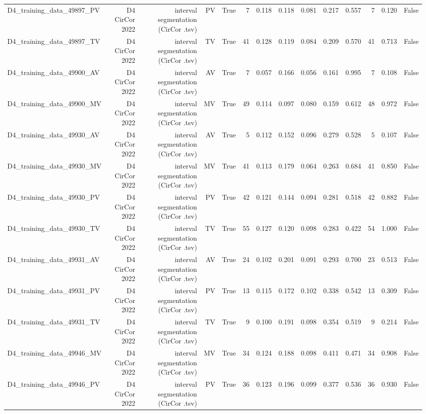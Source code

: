 \begin{table}[htbp]
\begin{tabular}{lrrrrrrrrrrrrr}
    D4\_training\_data\_49897\_PV & D4 CirCor 2022 & interval segmentation (CirCor .tsv) & PV & True & 7 & 0.118 & 0.118 & 0.081 & 0.217 & 0.557 & 7 & 0.120 & False \\
    D4\_training\_data\_49897\_TV & D4 CirCor 2022 & interval segmentation (CirCor .tsv) & TV & True & 41 & 0.128 & 0.119 & 0.084 & 0.209 & 0.570 & 41 & 0.713 & False \\
    D4\_training\_data\_49900\_AV & D4 CirCor 2022 & interval segmentation (CirCor .tsv) & AV & True & 7 & 0.057 & 0.166 & 0.056 & 0.161 & 0.995 & 7 & 0.108 & False \\
    D4\_training\_data\_49900\_MV & D4 CirCor 2022 & interval segmentation (CirCor .tsv) & MV & True & 49 & 0.114 & 0.097 & 0.080 & 0.159 & 0.612 & 48 & 0.972 & False \\
    D4\_training\_data\_49930\_AV & D4 CirCor 2022 & interval segmentation (CirCor .tsv) & AV & True & 5 & 0.112 & 0.152 & 0.096 & 0.279 & 0.528 & 5 & 0.107 & False \\
    D4\_training\_data\_49930\_MV & D4 CirCor 2022 & interval segmentation (CirCor .tsv) & MV & True & 41 & 0.113 & 0.179 & 0.064 & 0.263 & 0.684 & 41 & 0.850 & False \\
    D4\_training\_data\_49930\_PV & D4 CirCor 2022 & interval segmentation (CirCor .tsv) & PV & True & 42 & 0.121 & 0.144 & 0.094 & 0.281 & 0.518 & 42 & 0.882 & False \\
    D4\_training\_data\_49930\_TV & D4 CirCor 2022 & interval segmentation (CirCor .tsv) & TV & True & 55 & 0.127 & 0.120 & 0.098 & 0.283 & 0.422 & 54 & 1.000 & False \\
    D4\_training\_data\_49931\_AV & D4 CirCor 2022 & interval segmentation (CirCor .tsv) & AV & True & 24 & 0.102 & 0.201 & 0.091 & 0.293 & 0.700 & 23 & 0.513 & False \\
    D4\_training\_data\_49931\_PV & D4 CirCor 2022 & interval segmentation (CirCor .tsv) & PV & True & 13 & 0.115 & 0.172 & 0.102 & 0.338 & 0.542 & 13 & 0.309 & False \\
    D4\_training\_data\_49931\_TV & D4 CirCor 2022 & interval segmentation (CirCor .tsv) & TV & True & 9 & 0.100 & 0.191 & 0.098 & 0.354 & 0.519 & 9 & 0.214 & False \\
    D4\_training\_data\_49946\_MV & D4 CirCor 2022 & interval segmentation (CirCor .tsv) & MV & True & 34 & 0.124 & 0.188 & 0.098 & 0.411 & 0.471 & 34 & 0.908 & False \\
    D4\_training\_data\_49946\_PV & D4 CirCor 2022 & interval segmentation (CirCor .tsv) & PV & True & 36 & 0.123 & 0.196 & 0.099 & 0.377 & 0.536 & 36 & 0.930 & False \\

\end{tabular}
\end{table}
